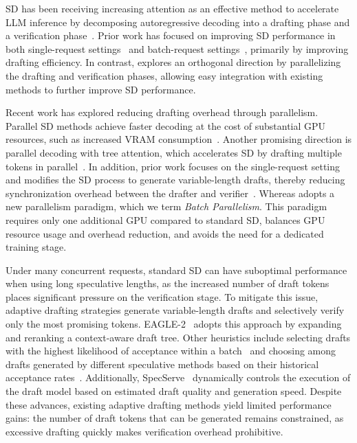 

 SD has been receiving increasing attention as an effective method to accelerate LLM inference by decomposing autoregressive decoding into a drafting phase and a verification phase~\citep{leviathan2023,ryu2024closerlook-survey,xia2024sd-survey}. 
Prior work has focused on improving SD performance in both single-request settings~\cite{cai2024medusa,cheng2024recurrentdrafterfastspeculative,zhang2024skiplayer,li2025eagle3,oliaro2025suffixdecoding} and batch-request settings~\citep{li2025adaserve,liu2025turbospec,wu2025tetris}, primarily by improving drafting efficiency. 
In contrast, \alg{} explores an orthogonal direction by parallelizing the drafting and verification phases, allowing easy integration with existing methods to further improve SD performance.


Recent work has explored reducing drafting overhead through parallelism. Parallel SD methods achieve faster decoding at the cost of substantial GPU resources, such as increased VRAM consumption~\citep{wang2024minions,timor2025distributed}. Another promising direction is parallel decoding with tree attention, which accelerates SD by drafting multiple tokens in parallel~\citep{cai2024medusa,li2024eagle}. 
In addition, prior work focuses on the single-request setting and modifies the SD process to generate variable-length drafts, thereby reducing synchronization overhead between the drafter and verifier~\citep{liu2025pearl}.
Whereas \alg{} adopts a new parallelism paradigm, which we term \textit{Batch Parallelism}. This paradigm requires only one additional GPU compared to standard SD, balances GPU resource usage and overhead reduction, and avoids the need for a dedicated training stage.


Under many concurrent requests, standard SD can have suboptimal performance when using long speculative lengths, as the increased number of draft tokens places significant pressure on the verification stage. To mitigate this issue, adaptive drafting strategies generate variable-length drafts and selectively verify only the most promising tokens. EAGLE-2~\citep{li2024eagle2} adopts this approach by expanding and reranking a context-aware draft tree. Other heuristics include selecting drafts with the highest likelihood of acceptance within a batch~\citep{wu2025tetris} and choosing among drafts generated by different speculative methods based on their historical acceptance rates~\citep{hou2025banditspec}. Additionally, SpecServe~\citep{huang2025specserve} dynamically controls the execution of the draft model based on estimated draft quality and generation speed.
Despite these advances, existing adaptive drafting methods yield limited performance gains: the number of draft tokens that can be generated remains constrained, as excessive drafting quickly makes verification overhead prohibitive.